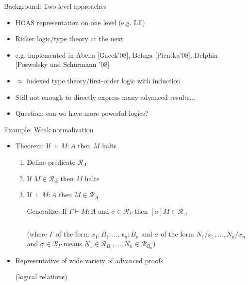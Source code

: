 \documentclass[usenames,dvipsnames]{beamer}
\newcommand{\const}[1]{\textbf{#1}}
\newcommand{\arrow}{\to}
\newcommand{\stepsto}{\longrightarrow}
\begin{document}
\begin{frame}{Background: Two-level approaches}
\begin{itemize}
\item HOAS representation on one level (e.g. LF)
\item Richer logic/type theory at the next
\item e.g. implemented in Abella [Gacek'08], Beluga [Pientka'08], Delphin [Poswolsky and Sch\"urmann '08]
\item $\approx$ indexed type theory/first-order logic with induction
\item Still not enough to directly express many advanced results...
\pause \item Question: can we have more powerful logics?
\end{itemize}
\end{frame}

\begin{frame}[fragile]{Example: Weak normalization}
\begin{itemize}
\item Theorem: If $\vdash M : A$ then $M$ halts
\pause
\begin{enumerate}
\item Define predicate $\mathcal{R}_A$
\item If $M \in \mathcal{R}_A$ then $M$ halts
\item If $\vdash M : A$ then $M \in \mathcal{R}_A$
\pause

Generalize: {\color{purple}If $\Gamma \vdash M : A$ and $\sigma \in \mathcal{R}_\Gamma$ then $[\sigma]M \in \mathcal{R}_A$}

$\,$

(where $\Gamma$ of the form $x_1{:}B_1,...,x_n{:}B_n$ and $\sigma$ of the form $N_1/x_1,...,N_n/x_n$ and $\sigma \in \mathcal{R}_\Gamma$ means $N_1 \in \mathcal{R}_{B_1},...,N_n \in \mathcal{R}_{B_n}$)
\end{enumerate}
\pause \item Representative of wide variety of advanced proofs

(logical relations)
\end{itemize}

\end{frame}
\end{document}
